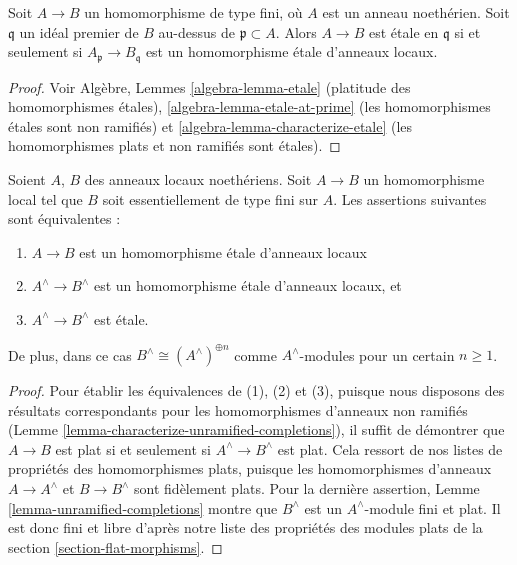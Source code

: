 \begin{lemma}
\label{lemma-characterize-etale-Noetherian}
Soit $A \to B$ un homomorphisme de type fini, où $A$ est un anneau noethérien.
Soit $\mathfrak q$ un idéal premier de $B$ au-dessus de $\mathfrak p \subset A$.
Alors $A \to B$ est \'etale en $\mathfrak q$ si et seulement si
$A_{\mathfrak p} \to B_{\mathfrak q}$ est un homomorphisme \'etale
d'anneaux locaux.
\end{lemma}

\begin{proof}
Voir Algèbre, Lemmes \ref{algebra-lemma-etale} (platitude des homomorphismes \'etales),
\ref{algebra-lemma-etale-at-prime} (les homomorphismes \'etales sont non ramifiés)
et \ref{algebra-lemma-characterize-etale} (les homomorphismes plats et non ramifiés
sont \'etales).
\end{proof}

\begin{lemma}
\label{lemma-characterize-etale-completions}
Soient $A$, $B$ des anneaux locaux noethériens.
Soit $A \to B$ un homomorphisme local tel que $B$ soit essentiellement de
type fini sur $A$.
Les assertions suivantes sont équivalentes :
\begin{enumerate}
\item $A \to B$ est un homomorphisme \'etale d'anneaux locaux
\item $A^\wedge \to B^\wedge$ est un homomorphisme \'etale d'anneaux locaux, et
\item $A^\wedge \to B^\wedge$ est \'etale.
\end{enumerate}
De plus, dans ce cas $B^\wedge \cong (A^\wedge)^{\oplus n}$ comme
$A^\wedge$-modules pour un certain $n \geq 1$.
\end{lemma}

\begin{proof}
Pour établir les équivalences de (1), (2) et (3), puisque nous disposons des résultats
correspondants pour les homomorphismes d'anneaux non ramifiés
(Lemme \ref{lemma-characterize-unramified-completions}),
il suffit de démontrer que
$A \to B$ est plat si et seulement si $A^\wedge \to B^\wedge$ est plat.
Cela ressort de nos listes de propriétés des homomorphismes plats, puisque
les homomorphismes d'anneaux $A \to A^\wedge$ et $B \to B^\wedge$ sont fidèlement plats.
Pour la dernière assertion, Lemme \ref{lemma-unramified-completions}
montre que $B^\wedge$ est un $A^\wedge$-module fini et plat.
Il est donc fini et libre d'après notre liste
des propriétés des modules plats de la section \ref{section-flat-morphisms}.
\end{proof}

